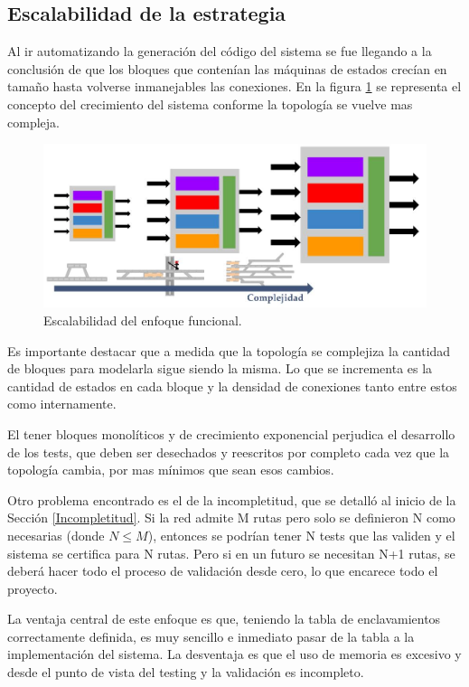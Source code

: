 	\subsection{Escalabilidad de la estrategia}	
		
		Al ir automatizando la generación del código del sistema se fue llegando a la conclusión de que los bloques que contenían las máquinas de estados crecían en tamaño hasta volverse inmanejables las conexiones. En la figura \ref{fig:Escala_Funcional} se representa el concepto del crecimiento del sistema conforme la topología se vuelve mas compleja.		
					
		\begin{figure}[h]
		\centering
			\includegraphics[scale=.4]{./Figures/Funcional_complejidad}
			\caption{Escalabilidad del enfoque funcional.}
			\label{fig:Escala_Funcional}
		\end{figure}
		
	Es importante destacar que a medida que la topología se complejiza la cantidad de bloques para modelarla sigue siendo la misma. Lo que se incrementa es la cantidad de estados en cada bloque y la densidad de conexiones tanto entre estos como internamente.
	
	El tener bloques monolíticos y de crecimiento exponencial perjudica el desarrollo de los tests, que deben ser desechados y reescritos por completo cada vez que la topología cambia, por mas mínimos que sean esos cambios. 
	
	Otro problema encontrado es el de la incompletitud, que se detalló al inicio de la Sección \ref{Incompletitud}. Si la red admite M rutas pero solo se definieron N como necesarias (donde $N \leq M$), entonces se podrían tener N tests que las validen y el sistema se certifica para N rutas. Pero si en un futuro se necesitan N+1 rutas, se deberá hacer todo el proceso de validación desde cero, lo que encarece todo el proyecto.
			
	La ventaja central de este enfoque es que, teniendo la tabla de enclavamientos correctamente definida, es muy sencillo e inmediato pasar de la tabla a la implementación del sistema. La desventaja es que el uso de memoria es excesivo y desde el punto de vista del testing y la validación es incompleto.			
					
